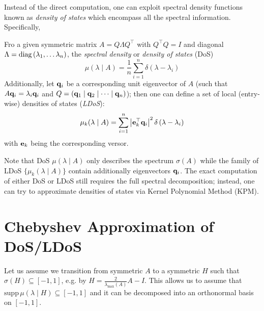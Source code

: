 \documentclass{mynotes}
\begin{document}
Instead of the direct computation, one can exploit spectral density functions known as \emph{density of states} which encompass all the spectral information. Specifically,

\begin{definition}
      Fro a given symmetric matrix \( A = Q \Lambda Q^\top \) with \( Q^\top Q = I \) and diagonal \( \Lambda = \operatorname{diag} \left( \lambda_1, \dots \lambda_{n} \right) \), the \emph{spectral density} or \emph{density of states} (DoS)
      \begin{equation}
            \mu( \lambda \mid A ) = \frac{1}{n} \sum_{i=1}^{n} \delta \left( \lambda - \lambda_i \right)
      \end{equation}
      Additionally, let \( \mathbf{q}_i \) be a corresponding unit eigenvector of \( A \) (such that \( A \mathbf{q}_i = \lambda_i \mathbf{q}_i \) and \( Q = \left( \mathbf{q}_1 \mid \mathbf{q}_2 \mid \dots \mid \mathbf{q}_n \right)\)); then one can define a set of local (entry-wise) densities of states (\emph{LDoS}):
      \begin{equation}
            \mu_k ( \lambda \mid A ) = \sum_{i=1}^{n} \left| \mathbf{e}_k^\top \mathbf{q}_i \right|^2 \delta \left( \lambda - \lambda_i \right)
      \end{equation}
      with \( \mathbf{e}_k \) being the corresponding versor. 
\end{definition}

Note that DoS \( \mu ( \lambda \mid A ) \) only describes the spectrum \( \sigma ( A ) \) while the family of LDoS \( \{ \mu_k (\lambda \mid A ) \} \) contain additionally eigenvectors \( \mathbf{q}_i \). The exact computation of either DoS or LDoS still requires the full spectral decomposition; instead, one can try to approximate densities of states via Kernel Polynomial Method (KPM).%

\section{ Chebyshev Approximation of DoS/LDoS }

Let us assume we transition from symmetric \( A \) to a symmetric \( H \) such that \( \sigma(H) \subseteq [-1, 1 ]\), e.g. by \( H = \frac{2}{ \lambda_{\max{}} ( A ) } A - I \). This allows us to assume that \( \mathrm{supp}\, \mu( \lambda \mid H ) \subseteq [-1, 1]\) and it can be decomposed into an orthonormal basis on \( [-1, 1]\). 
\end{document}
